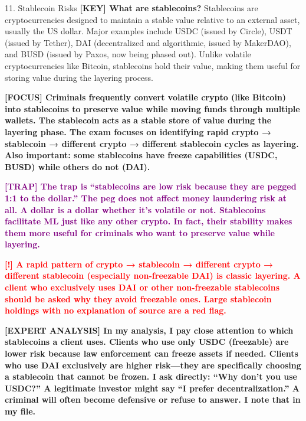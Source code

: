 \documentclass[11pt,a4paper]{beamer}
\newcommand{\redflag}[1]{\textcolor{red}{\textbf{[!] #1}}}
\newcommand{\examfocus}[1]{\textcolor{orange!80!black}{\textbf{[FOCUS] #1}}}
\newcommand{\trap}[1]{\textcolor{purple}{\textbf{[TRAP] #1}}}
\newcommand{\keyterm}[1]{\textcolor{red!80!black}{\textbf{[KEY] #1}}}
\newcommand{\expert}[1]{\textcolor{blue!70!black}{\textbf{[EXPERT ANALYSIS] #1}}}
\begin{document}
	\begin{frame}{11. Stablecoin Risks}
		\tiny
		\keyterm{What are stablecoins?} Stablecoins are cryptocurrencies designed to maintain a stable value relative to an external asset, usually the US dollar. Major examples include USDC (issued by Circle), USDT (issued by Tether), DAI (decentralized and algorithmic, issued by MakerDAO), and BUSD (issued by Paxos, now being phased out). Unlike volatile cryptocurrencies like Bitcoin, stablecoins hold their value, making them useful for storing value during the layering process.
		
		\vspace{0.1cm}
		\examfocus{Criminals frequently convert volatile crypto (like Bitcoin) into stablecoins to preserve value while moving funds through multiple wallets. The stablecoin acts as a stable store of value during the layering phase. The exam focuses on identifying rapid crypto → stablecoin → different crypto → different stablecoin cycles as layering. Also important: some stablecoins have freeze capabilities (USDC, BUSD) while others do not (DAI).}
		
		\vspace{0.1cm}
		\trap{The trap is “stablecoins are low risk because they are pegged 1:1 to the dollar.” The peg does not affect money laundering risk at all. A dollar is a dollar whether it's volatile or not. Stablecoins facilitate ML just like any other crypto. In fact, their stability makes them more useful for criminals who want to preserve value while layering.}
		
		\vspace{0.1cm}
		\redflag{A rapid pattern of crypto → stablecoin → different crypto → different stablecoin (especially non-freezable DAI) is classic layering. A client who exclusively uses DAI or other non-freezable stablecoins should be asked why they avoid freezable ones. Large stablecoin holdings with no explanation of source are a red flag.}
		
		\vspace{0.1cm}
		\expert{In my analysis, I pay close attention to which stablecoins a client uses. Clients who use only USDC (freezable) are lower risk because law enforcement can freeze assets if needed. Clients who use DAI exclusively are higher risk—they are specifically choosing a stablecoin that cannot be frozen. I ask directly: “Why don't you use USDC?” A legitimate investor might say “I prefer decentralization.” A criminal will often become defensive or refuse to answer. I note that in my file.}
	\end{frame}
	
\end{document}
